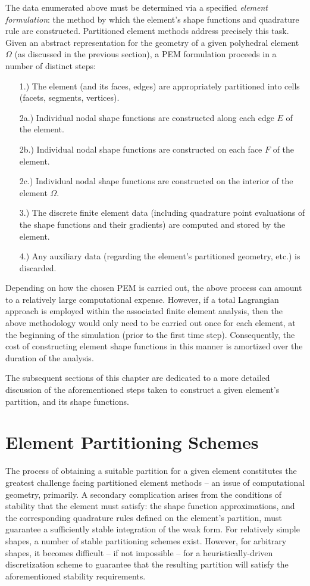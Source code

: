 	The data enumerated above must be determined via a specified \textit{element formulation}: the method by which the element's shape functions and quadrature rule are constructed. Partitioned element methods address precisely this task. Given an abstract representation for the geometry of a given polyhedral element $\Omega$ (as discussed in the previous section), a PEM formulation proceeds in a number of distinct steps:
	\begin{itemize}
		\item[1.)] The element (and its faces, edges) are appropriately partitioned into cells (facets, segments, vertices).
		\item[2a.)] Individual nodal shape functions are constructed along each edge $E$ of the element.
		\item[2b.)] Individual nodal shape functions are constructed on each face $F$ of the element.
		\item[2c.)] Individual nodal shape functions are constructed on the interior of the element $\Omega$.
		\item[3.)] The discrete finite element data (including quadrature point evaluations of the shape functions and their gradients) are computed and stored by the element.
		\item[4.)] Any auxiliary data (regarding the element's partitioned geometry, etc.) is discarded.
	\end{itemize}
	
	Depending on how the chosen PEM is carried out, the above process can amount to a relatively large computational expense. However, if a total Lagrangian approach is employed within the associated finite element analysis, then the above methodology would only need to be carried out once for each element, at the beginning of the simulation (prior to the first time step). Consequently, the cost of constructing element shape functions in this manner is amortized over the duration of the analysis.
	
	The subsequent sections of this chapter are dedicated to a more detailed discussion of the aforementioned steps taken to construct a given element's partition, and its shape functions.
	
\section{Element Partitioning Schemes}

	The process of obtaining a suitable partition for a given element constitutes the greatest challenge facing partitioned element methods -- an issue of computational geometry, primarily. A secondary complication arises from the conditions of stability that the element must satisfy: the shape function approximations, and the corresponding quadrature rules defined on the element's partition, must guarantee a sufficiently stable integration of the weak form. For relatively simple shapes, a number of stable partitioning schemes exist. However, for arbitrary shapes, it becomes difficult -- if not impossible -- for a heuristically-driven discretization scheme to guarantee that the resulting partition will satisfy the aforementioned stability requirements.

